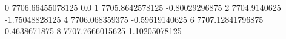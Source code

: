 0 7706.66455078125 0.0
1 7705.8642578125 -0.80029296875
2 7704.9140625 -1.75048828125
4 7706.068359375 -0.59619140625
6 7707.12841796875 0.4638671875
8 7707.7666015625 1.10205078125
